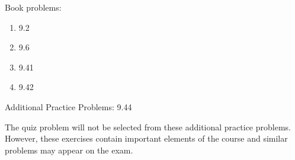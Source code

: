 
Book problems:
\begin{enumerate}
  \item 9.2
  \item 9.6
  \item 9.41
  \item 9.42
\end{enumerate}

Additional Practice Problems: 9.44

\noindent The quiz problem will not be selected from these additional practice problems.  However, these exercises contain important elements of the course and similar problems may appear on the exam.

\iftoggle{flagSoln}{%
\vspace{.5cm}
\rule{\textwidth}{.4pt}
\vspace{.5cm}
\textbf{Solution:}
\begin{enumerate}
  \item[9.2] $3a^3b/10$
  \item[9.6] $ab^3/6$
  \item[9.41] $\bar{I}_x = 46.8 \times 10^6$ $mm^4$, $\bar{I}_y = 13.89 \times 10^6$ $mm^4$ 
  \item[9.42] $\bar{I}_x = 479 \times 10^3$ $mm^4$, $\bar{I}_y = 149.7 \times 10^3$ $mm^4$ 
\end{enumerate}
}{%
}%
